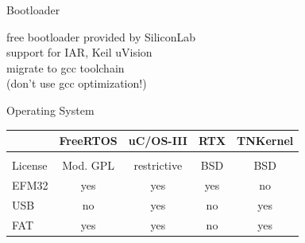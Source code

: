 \documentclass[compress,red]{beamer}
\begin{document}

\begin{frame}{Bootloader}
  \Large
  \begin{center}
    free bootloader provided by SiliconLab \\
    \vskip 1cm
    support for IAR, Keil uVision \\
    \vskip 1cm
    migrate to gcc toolchain \\
    \vskip 1cm
    (don't use gcc optimization!)
  \end{center}

\end{frame}


\begin{frame}{Operating System}
 \large
 \begin{center}
  \begin{tabular}{lcccc}
    & FreeRTOS & uC/OS-III & RTX & TNKernel \\[2.5mm]
    \hline
    \\[1mm]
   License & Mod. GPL & restrictive & BSD & BSD \\[5mm]
   EFM32   & yes      & yes         & yes & no  \\[5mm]
   USB     & no       & yes         & no  & yes \\[5mm]
   FAT     & yes      & yes         & no  & yes \\
  \end{tabular}
 \end{center}

\end{frame}

\end{document}
